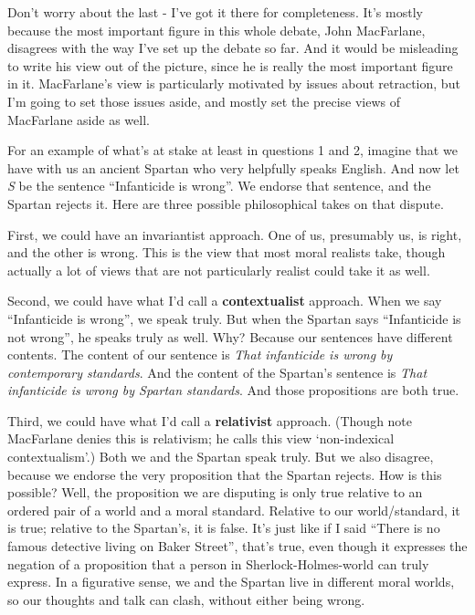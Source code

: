 \documentclass[
]{article}
\begin{document}
Don't worry about the last - I've got it there for completeness. It's
mostly because the most important figure in this whole debate, John
MacFarlane, disagrees with the way I've set up the debate so far. And it
would be misleading to write his view out of the picture, since he is
really the most important figure in it. MacFarlane's view is
particularly motivated by issues about retraction, but I'm going to set
those issues aside, and mostly set the precise views of MacFarlane aside
as well.

For an example of what's at stake at least in questions 1 and 2, imagine
that we have with us an ancient Spartan who very helpfully speaks
English. And now let \emph{S} be the sentence ``Infanticide is wrong''.
We endorse that sentence, and the Spartan rejects it. Here are three
possible philosophical takes on that dispute.

First, we could have an invariantist approach. One of us, presumably us,
is right, and the other is wrong. This is the view that most moral
realists take, though actually a lot of views that are not particularly
realist could take it as well.

Second, we could have what I'd call a \textbf{contextualist} approach.
When we say ``Infanticide is wrong'', we speak truly. But when the
Spartan says ``Infanticide is not wrong'', he speaks truly as well. Why?
Because our sentences have different contents. The content of our
sentence is \emph{That infanticide is wrong by contemporary standards}.
And the content of the Spartan's sentence is \emph{That infanticide is
wrong by Spartan standards}. And those propositions are both true.

Third, we could have what I'd call a \textbf{relativist} approach.
(Though note MacFarlane denies this is relativism; he calls this view
`non-indexical contextualism'.) Both we and the Spartan speak truly. But
we also disagree, because we endorse the very proposition that the
Spartan rejects. How is this possible? Well, the proposition we are
disputing is only true relative to an ordered pair of a world and a
moral standard. Relative to our world/standard, it is true; relative to
the Spartan's, it is false. It's just like if I said ``There is no
famous detective living on Baker Street'', that's true, even though it
expresses the negation of a proposition that a person in
Sherlock-Holmes-world can truly express. In a figurative sense, we and
the Spartan live in different moral worlds, so our thoughts and talk can
clash, without either being wrong.
\end{document}
